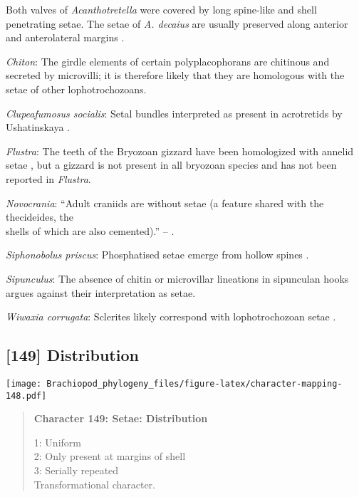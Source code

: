 \documentclass[openany]{book}
\theoremstyle{definition}
\theoremstyle{definition}
\theoremstyle{definition}
\theoremstyle{remark}
\begin{document}
Both valves of \emph{Acanthotretella} were covered by long spine-like
and shell penetrating setae. The setae of \emph{A. decaius} are usually
preserved along anterior and anterolateral margins
\citep{Hu2010Softpart}.

\hypertarget{Chiton-coding-148}{}
\emph{Chiton}: The girdle elements of certain polyplacophorans are
chitinous and secreted by microvilli; it is therefore likely that they
are homologous with the setae of other lophotrochozoans.

\hypertarget{Clupeafumosus_socialis-coding-148}{}
\emph{Clupeafumosus socialis}: Setal bundles interpreted as present in
acrotretids by Ushatinskaya \citeyearpar{Ushatinskaya2016Protegulumand}.

\hypertarget{Flustra-coding-148}{}
\emph{Flustra}: The teeth of the Bryozoan gizzard have been homologized
with annelid setae \citep{Gordon1975}, but a gizzard is not present in
all bryozoan species and has not been reported in \emph{Flustra}.

\hypertarget{Novocrania-coding-148}{}
\emph{Novocrania}: ``Adult craniids are without setae (a feature shared
with the thecideides, the\\
shells of which are also cemented).'' -- \citet{Williams2007Supplement}.

\hypertarget{Siphonobolus_priscus-coding-148}{}
\emph{Siphonobolus priscus}: Phosphatised setae emerge from hollow
spines \citep{Popov2009Earlyontogeny}.

\hypertarget{Sipunculus-coding-148}{}
\emph{Sipunculus}: The absence of chitin or microvillar lineations in
sipunculan hooks argues against their interpretation as setae.

\hypertarget{Wiwaxia_corrugata-coding-148}{}
\emph{Wiwaxia corrugata}: Sclerites likely correspond with
lophotrochozoan setae \citep{Butterfield1990, Smith2014, Zhang2015}.

\subsection*{{[}149{]} Distribution}\label{distribution}

\texttt{[image: Brachiopod\_phylogeny\_files/figure-latex/character-mapping-148.pdf]}

\begin{quote}
\textbf{Character 149: Setae: Distribution}

1: Uniform\\
2: Only present at margins of shell\\
3: Serially repeated\\
Transformational character.
\end{quote}
\end{document}
